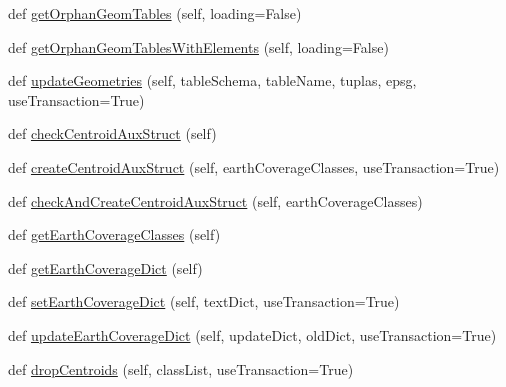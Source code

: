 \begin{DoxyCompactItemize}
\item 
def \mbox{\hyperlink{class_dsg_tools_1_1_factories_1_1_db_factory_1_1postgis_db_1_1_postgis_db_aae3059a8f801efd4da98bbd3ebbff1c7}{get\+Orphan\+Geom\+Tables}} (self, loading=False)
\item 
def \mbox{\hyperlink{class_dsg_tools_1_1_factories_1_1_db_factory_1_1postgis_db_1_1_postgis_db_abb82aa10c5652a8c38442a4c15d8eeba}{get\+Orphan\+Geom\+Tables\+With\+Elements}} (self, loading=False)
\item 
def \mbox{\hyperlink{class_dsg_tools_1_1_factories_1_1_db_factory_1_1postgis_db_1_1_postgis_db_a215b17e70db71b8e917a73276896f9ab}{update\+Geometries}} (self, table\+Schema, table\+Name, tuplas, epsg, use\+Transaction=True)
\item 
def \mbox{\hyperlink{class_dsg_tools_1_1_factories_1_1_db_factory_1_1postgis_db_1_1_postgis_db_a790e153106a996b3f70cddea3a922391}{check\+Centroid\+Aux\+Struct}} (self)
\item 
def \mbox{\hyperlink{class_dsg_tools_1_1_factories_1_1_db_factory_1_1postgis_db_1_1_postgis_db_a36cb595dec4d566e10994f2edc227621}{create\+Centroid\+Aux\+Struct}} (self, earth\+Coverage\+Classes, use\+Transaction=True)
\item 
def \mbox{\hyperlink{class_dsg_tools_1_1_factories_1_1_db_factory_1_1postgis_db_1_1_postgis_db_ac253585db10658abbdb39adb0537d4d7}{check\+And\+Create\+Centroid\+Aux\+Struct}} (self, earth\+Coverage\+Classes)
\item 
def \mbox{\hyperlink{class_dsg_tools_1_1_factories_1_1_db_factory_1_1postgis_db_1_1_postgis_db_a2f2b99da15dfe44411c6e10c6270db24}{get\+Earth\+Coverage\+Classes}} (self)
\item 
def \mbox{\hyperlink{class_dsg_tools_1_1_factories_1_1_db_factory_1_1postgis_db_1_1_postgis_db_a29b23c68ed63b4d2211db3db37d0194d}{get\+Earth\+Coverage\+Dict}} (self)
\item 
def \mbox{\hyperlink{class_dsg_tools_1_1_factories_1_1_db_factory_1_1postgis_db_1_1_postgis_db_a29caf37621c8c30add3322f044fe702f}{set\+Earth\+Coverage\+Dict}} (self, text\+Dict, use\+Transaction=True)
\item 
def \mbox{\hyperlink{class_dsg_tools_1_1_factories_1_1_db_factory_1_1postgis_db_1_1_postgis_db_ae61407d11e5b719bda0b1fbc8fc3a126}{update\+Earth\+Coverage\+Dict}} (self, update\+Dict, old\+Dict, use\+Transaction=True)
\item 
def \mbox{\hyperlink{class_dsg_tools_1_1_factories_1_1_db_factory_1_1postgis_db_1_1_postgis_db_a38741d156f8168459c1e9579aac213d2}{drop\+Centroids}} (self, class\+List, use\+Transaction=True)

\end{DoxyCompactItemize}
